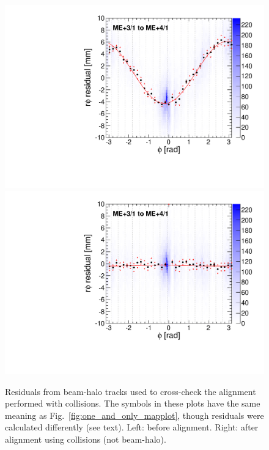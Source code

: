 \documentclass[12pt]{article}
\begin{document}
\begin{figure}
\includegraphics[width=0.45\linewidth]{BHCrossCheck_mep41_before.pdf} \hfill
\includegraphics[width=0.45\linewidth]{BHCrossCheck_mep41_after.pdf}

\caption{Residuals from beam-halo tracks used to cross-check the
  alignment performed with collisions.  The symbols in these plots
  have the same meaning as Fig.~\ref{fig:one_and_only_mapplot}, though
  residuals were calculated differently (see text).  Left: before
  alignment.  Right: after alignment using collisions (not
  beam-halo).  \label{fig:BHCrossCheck_mep41}}
\end{figure}
\end{document}
